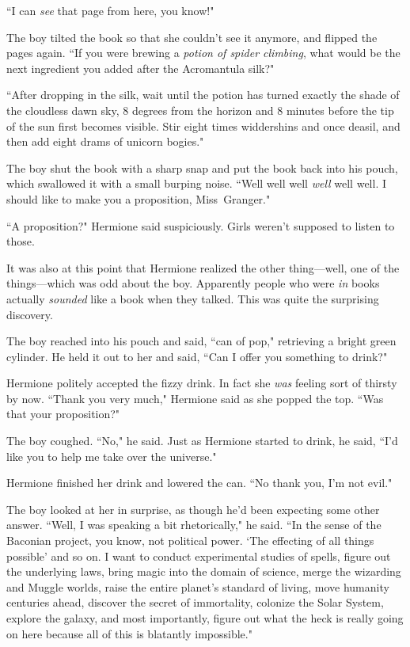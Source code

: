 ``I can \emph{see} that page from here, you know!"

The boy tilted the book so that she couldn't see it anymore, and flipped the pages again. ``If you were brewing a \emph{potion of spider climbing}, what would be the next ingredient you added after the Acromantula silk?"

``After dropping in the silk, wait until the potion has turned exactly the shade of the cloudless dawn sky, 8 degrees from the horizon and 8 minutes before the tip of the sun first becomes visible. Stir eight times widdershins and once deasil, and then add eight drams of unicorn bogies."

The boy shut the book with a sharp snap and put the book back into his pouch, which swallowed it with a small burping noise. ``Well well well \emph{well} well well. I should like to make you a proposition, Miss~Granger."

``A proposition?" Hermione said suspiciously. Girls weren't supposed to listen to those.

It was also at this point that Hermione realized the other thing---well, one of the things---which was odd about the boy. Apparently people who were \emph{in} books actually \emph{sounded} like a book when they talked. This was quite the surprising discovery.

The boy reached into his pouch and said, ``can of pop," retrieving a bright green cylinder. He held it out to her and said, ``Can I offer you something to drink?"

Hermione politely accepted the fizzy drink. In fact she \emph{was} feeling sort of thirsty by now. ``Thank you very much," Hermione said as she popped the top. ``Was that your proposition?"

The boy coughed. ``No," he said. Just as Hermione started to drink, he said, ``I'd like you to help me take over the universe."

Hermione finished her drink and lowered the can. ``No thank you, I'm not evil."

The boy looked at her in surprise, as though he'd been expecting some other answer. ``Well, I was speaking a bit rhetorically," he said. ``In the sense of the Baconian project, you know, not political power. `The effecting of all things possible' and so on. I want to conduct experimental studies of spells, figure out the underlying laws, bring magic into the domain of science, merge the wizarding and Muggle worlds, raise the entire planet's standard of living, move humanity centuries ahead, discover the secret of immortality, colonize the Solar System, explore the galaxy, and most importantly, figure out what the heck is really going on here because all of this is blatantly impossible."

